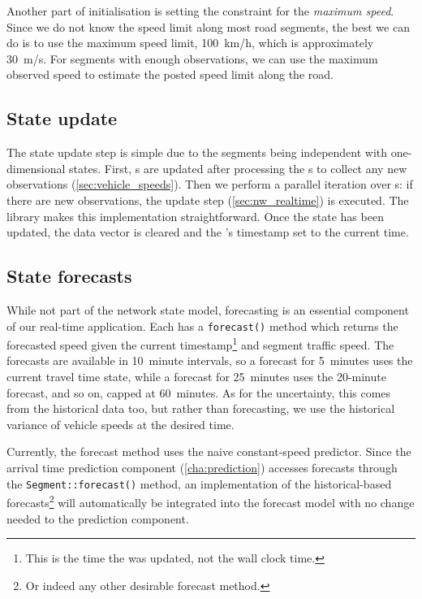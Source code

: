 Another part of initialisation is setting the constraint for the \emph{maximum speed}. Since we do not know the speed limit along most road segments, the best we can do is to use the maximum speed limit, 100~km/h, which is approximately 30~m/s. For segments with enough observations, we can use the maximum observed speed to estimate the posted speed limit along the road.



\subsection{State update}
\label{sec:nw_implementation_update}

The state update step is simple due to the segments being independent with one-dimensional states. First, s are updated after processing the s to collect any new observations (\cref{sec:vehicle_speeds}). Then we perform a parallel iteration over s: if there are new observations, the update step (\cref{sec:nw_realtime}) is executed. The  library makes this implementation straightforward. Once the state has been updated, the data vector is cleared and the 's timestamp set to the current time.


\subsection{State forecasts}
\label{sec:nw_implementation_forecast}

While not part of the network state model, forecasting is an essential component of our real-time application. Each  has a \verb+forecast()+ method which returns the forecasted speed given the current timestamp\footnote{This is the time the  was updated, not the wall clock time.} and segment traffic speed. The forecasts are available in 10~minute intervals, so a forecast for 5~minutes uses the current travel time state, while a forecast for 25~minutes uses the 20-minute forecast, and so on, capped at 60~minutes. As for the uncertainty, this comes from the historical data too, but rather than forecasting, we use the historical variance of vehicle speeds at the desired time.

Currently, the forecast method uses the na\:ive constant-speed predictor. Since the arrival time prediction component (\cref{cha:prediction}) accesses forecasts through the \verb+Segment::forecast()+ method, an implementation of the historical-based forecasts\footnote{Or indeed any other desirable forecast method.} will automatically be integrated into the forecast model with no change needed to the prediction component.
